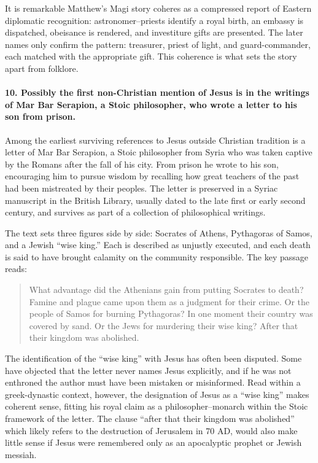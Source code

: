 It is remarkable Matthew’s Magi story coheres as a compressed report of Eastern diplomatic recognition: astronomer–priests identify a royal birth, an embassy is dispatched, obeisance is rendered, and investiture gifts are presented.
The later names only confirm the pattern: treasurer, priest of light, and guard-commander, each matched with the appropriate gift.
This coherence is what sets the story apart from folklore.

\paragraph{10.
Possibly the first non-Christian mention of Jesus is in the writings of Mar Bar Serapion, a Stoic philosopher, who wrote a letter to his son from prison.}\label{par:possibly-the-first-non-christian-mention-of-jesus-is-in-the-writings-of-mar-bar-serapion-a-stoic-philosopher-who-wrote-a-letter-to-his-son-from-prison.}

Among the earliest surviving references to Jesus outside Christian tradition is a letter of Mar Bar Serapion, a Stoic philosopher from Syria who was taken captive by the Romans after the fall of his city.
From prison he wrote to his son, encouraging him to pursue wisdom by recalling how great teachers of the past had been mistreated by their peoples.
The letter is preserved in a Syriac manuscript in the British Library, usually dated to the late first or early second century, and survives as part of a collection of philosophical writings.

The text sets three figures side by side: Socrates of Athens, Pythagoras of Samos, and a Jewish “wise king.”
Each is described as unjustly executed, and each death is said to have brought calamity on the community responsible.
The key passage reads:
\begin{quote}
    What advantage did the Athenians gain from putting Socrates to death?
    Famine and plague came upon them as a judgment for their crime.
    Or the people of Samos for burning Pythagoras?
    In one moment their country was covered by sand.
    Or the Jews for murdering their wise king?
    After that their kingdom was abolished.
\end{quote}

The identification of the “wise king” with Jesus has often been disputed.
Some have objected that the letter never names Jesus explicitly, and if he was not enthroned the author must have been mistaken or misinformed.
Read within a greek-dynastic context, however, the designation of Jesus as a “wise king” makes coherent sense, fitting his royal claim as a philosopher–monarch within the Stoic framework of the letter.
The clause “after that their kingdom was abolished” which likely refers to the destruction of Jerusalem in 70 AD, would also make little sense if Jesus were remembered only as an apocalyptic prophet or Jewish messiah.


